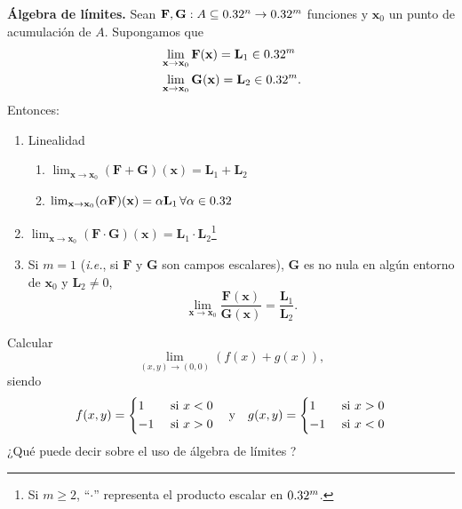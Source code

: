 \begin{propertie}\textbf{\'Algebra de l\'imites.} \label{prop:alg_lim} Sean $\mathbf{F},\mathbf{G}:A  \subseteq  0.32^n \to 0.32^m$ funciones y $\mathbf{x}_0$ un punto de acumulaci\'on de $A$. Supongamos que 
  \begin{align*}
   &\lim_{\mathbf{x} \to \mathbf{x}_0} \mathbf{F}(\mathbf{x}) = \mathbf{L}_1 \in 0.32^m \\
   &\lim_{\mathbf{x} \to \mathbf{x}_0} \mathbf{G}(\mathbf{x}) = \mathbf{L}_2 \in 0.32^m.
  \end{align*}
  Entonces:
  \begin{enumerate} %
   \item Linealidad
      \begin{enumerate} %
       \item $\lim_{\mathbf{x} \to \mathbf{x}_0} (\mathbf{F} + \mathbf{G})(\mathbf{x}) = \mathbf{L}_1 + \mathbf{L}_2$
       \item $\lim_{\mathbf{x} \to \mathbf{x}_0} (\alpha \mathbf{F})(\mathbf{x}) = \alpha \mathbf{L}_1 \, \forall \alpha \in 0.32$
      \end{enumerate}
  \item $\lim_{\mathbf{x} \to \mathbf{x}_0} (\mathbf{F} \cdot \mathbf{G}) (\mathbf{x}) = \mathbf{L}_1 \cdot \mathbf{L}_2$\footnote{Si $m \ge 2$, ``$\cdot$'' representa el producto escalar en $0.32^m$.}
  \item Si $m = 1$ (\textit{i.e.}, si $\mathbf{F} \text{ y } \mathbf{G}$ son campos escalares), $\mathbf{G}$ es no nula en alg\'un entorno de $\mathbf{x}_0$ y $\mathbf{L}_2 \ne 0$, 
  \[
   \lim_{\mathbf{x} \to \mathbf{x}_0} \frac{\mathbf{F}(\mathbf{x})}{\mathbf{G}(\mathbf{x})} = \frac{\mathbf{L}_1}{\mathbf{L}_2}.
  \]
  \end{enumerate}
\end{propertie}

\begin{tarea} Calcular $$ \lim_{(x,y) \to (0,0)}  (f(x) + g(x)),$$ siendo
 $$f(x,y) = 
     \begin{dcases}
         1  &  \text{ si } x < 0  \\
        -1                 & \text{ si }  x>0
     \end{dcases} \:\:\:  \text{ y }    \:\:\:  
  g(x,y) = 
     \begin{dcases}
         1  &  \text{ si } x > 0  \\
        -1                 & \text{ si }  x<0
     \end{dcases}$$   ¿Qu\'e puede decir sobre el uso de \'algebra de l\'imites ?
\end{tarea}

